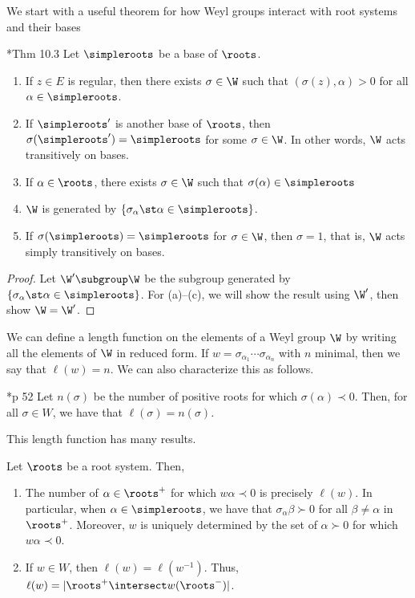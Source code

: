 \documentclass[11pt,leqno,oneside]{amsart}
\numberwithin{thm}{section}
\begin{document}
We start with a useful theorem for how Weyl groups interact with root
systems and their bases
\begin{thm}\label{weyl-gp-and-simple-system}
  \cite{humph}*{Thm 10.3} Let \(\simpleroots\) be a base of \(\roots\).
  \begin{enumerate}
  \item If \(z \in E\) is regular, then there exists \(\sigma \in \W\)
    such that \((\sigma(z), \alpha) > 0\) for all \(\alpha \in
    \simpleroots\).
  \item If \(\simpleroots'\) is another base of \(\roots\), then
    \(\sigma(\simpleroots') = \simpleroots\) for some \(\sigma \in
    \W\). In other words, \(\W\) acts transitively on bases.
  \item If \(\alpha \in \roots\), there exists \(\sigma \in \W\) such
    that \(\sigma(\alpha) \in \simpleroots\)
  \item \(\W\) is generated by \(\{\sigma_\alpha \st \alpha \in
    \simpleroots\}\). 
  \item If \(\sigma(\simpleroots) = \simpleroots\) for \(\sigma \in
    \W\), then \(\sigma = 1\), that is, \(\W\) acts simply
    transitively on bases.
  \end{enumerate}
\end{thm}
\begin{proof}
  Let \(\W' \subgroup \W\) be the subgroup generated by 
  \(\{\sigma_\alpha \st \alpha \in \simpleroots\}\). For (a)--(c), we
  will show the result using \(\W'\), then show \(\W =
  \W'\). 
\end{proof}
We can define a length function on the elements of a Weyl group $\W$
by writing all the elements of $\W$ in reduced form. If $w =
\sigma_{\alpha_1} \cdots \sigma_{\alpha_n}$ with $n$ minimal, then we
say that 
$\ell(w) = n$. We can also characterize this as follows.
\begin{lem}
\cite{humph}*{p 52} Let
$n(\sigma)$ be the number of positive roots for which $\sigma(\alpha)
\prec 0$. Then, for all $\sigma \in W$, we have that $\ell(\sigma) =
n(\sigma)$. 
\end{lem}
This length function has many results.
\begin{prop}
  Let $\roots$ be a root system. Then,
  \begin{enumerate}
  \item The number of $\alpha \in \roots^+$ for which $w \alpha \prec 0$ is
    precisely $\ell(w)$. In particular, when $\alpha \in \simpleroots$, we
    have that $\sigma_\alpha \beta \succ 0$ for all $\beta \neq \alpha$ in
    $\roots^+$. Moreover, $w$ is uniquely determined by the set of
    $\alpha \succ 0$ for which $w\alpha \prec 0$.
  \item If $w \in W$, then $\ell(w) = \ell(w^{-1})$. Thus, $\ell(w) =
    |\roots^+ \intersect w(\roots^-)|$.
  \end{enumerate}
\end{prop}
\end{document}
